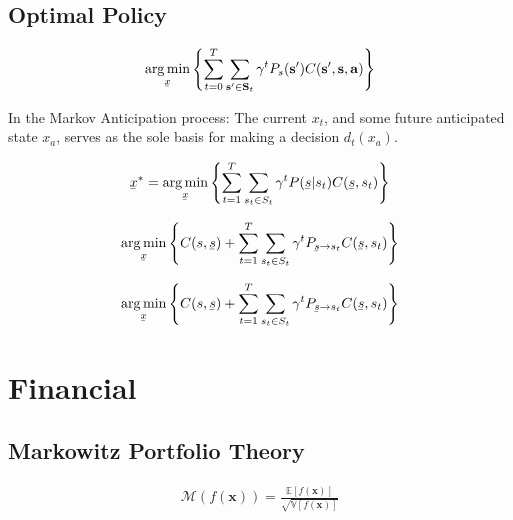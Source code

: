 \documentclass[]{usiinfdocprop}
\newcommand{\E}[1]{\mathbb{E} \left[#1 \right]}
\newcommand{\V}[1]{\mathbb{V} \left[#1 \right]}
\DeclareMathOperator*{\argmin}{arg\,min}
\newcommand{\bb}[1]{\boldsymbol{\mathbf{#1}}}
\newcommand{\ubar}[1]{\underaccent{\bar}{#1}}
\begin{document}
\subsection{Optimal Policy}
\begin{equation}
  \argmin_{\ubar{x}} \left\{   \sum^{T}_{t=0}   \sum_{ \bb{s}' \in \bb{S}_t} \gamma^t P_{s}(\bb{s}') C(\bb{s}',\bb{s},\bb{a})  \right\} 
\end{equation}




In the Markov Anticipation process: The current $x_{t}$, and some future anticipated state $x_{a}$, serves as the sole basis for making a decision $d_{t}(x_{a})$. 

\begin{equation}
    \ubar{x}^*=\argmin_{\ubar{x}} \left\{  \sum^{T}_{t=1}   \sum_{s_t \in S_t} \gamma^t P(\ubar{s}|s_{t}) C(\ubar{s},s_t) \right\} 
\end{equation}



\begin{equation}
  \argmin_{ \ubar{x}} \left\{  C(s,\ubar{s})  + \sum^{T}_{t=1}   \sum_{s_t \in S_t} \gamma^t P_{\ubar{s} \to s_{t}} C(\ubar{s},s_t) \right\} 
\end{equation}




\begin{equation}
  \argmin_{\ubar{x}} \left\{  C(s,\ubar{s})  + \sum^{T}_{t=1}   \sum_{s_t \in S_t} \gamma^t P_{\ubar{s} \to s_{t}} C(\ubar{s},s_t) \right\} 
\end{equation}



\section{Financial}

\subsection{Markowitz Portfolio Theory}



\begin{align}
    \mathcal{M}(f(\bb{x})) =  \frac{\E{f(\bb{x})} }{\sqrt{\V{f(\bb{x})} } }
\end{align}
\end{document}
